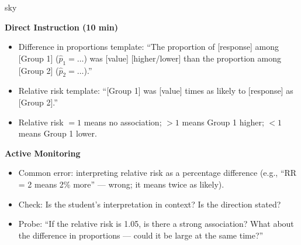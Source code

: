 \documentclass[10pt]{article}
\begin{document}
\begin{skillbox}{sky}
\begin{minipage}[t]{0.48\linewidth}
    \textbf{Direct Instruction (10 min)}
    \begin{itemize}
        \item Difference in proportions template: ``The proportion of [response] among [Group 1] ($\hat{p}_1 = \ldots$) was [value] [higher/lower] than the proportion among [Group 2] ($\hat{p}_2 = \ldots$).''
        \item Relative risk template: ``[Group 1] was [value] times as likely to [response] as [Group 2].''
        \item Relative risk $= 1$ means no association; $> 1$ means Group 1 higher; $< 1$ means Group 1 lower.
    \end{itemize}
\end{minipage}
\hfill
\begin{minipage}[t]{0.48\linewidth}
    \textbf{Active Monitoring}
    \begin{itemize}
        \item Common error: interpreting relative risk as a percentage difference (e.g., ``RR = 2 means 2\% more'' --- wrong; it means twice as likely).
        \item Check: Is the student's interpretation in context? Is the direction stated?
        \item Probe: ``If the relative risk is 1.05, is there a strong association? What about the difference in proportions --- could it be large at the same time?''
    \end{itemize}
\end{minipage}
\end{skillbox}
\end{document}
